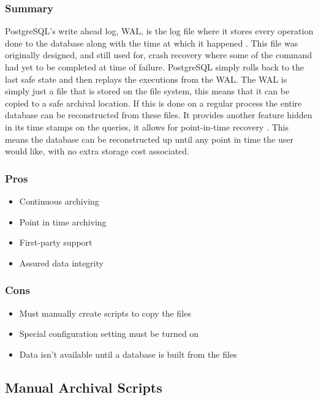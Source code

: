 \documentclass[draftclsnofoot,onecolumn,journal,letterpaper,compsoc,10pt]{IEEEtran}
\begin{document}
        \subsubsection{Summary}
        
        PostgreSQL's write ahead log, WAL, is the log file where it stores every operation done to the database along with the time at which it happened \cite{postgresql_wal}.  This file was originally designed, and still used for, crash recovery where some of the command had yet to be completed at time of failure.  PostgreSQL simply rolls back to the last safe state and then replays the executions from the WAL.  The WAL is simply just a file that is stored on the file system, this means that it can be copied to a safe archival location.  If this is done on a regular process the entire database can be reconstructed from these files.  It provides another feature hidden in its time stamps on the queries, it allows for point-in-time recovery \cite{postgresql_wal}.  This means the database can be reconstructed up until any point in time the user would like, with no extra storage cost associated.
        
        \subsubsection{Pros}
        \begin{itemize}
            \item Continuous archiving
            \item Point in time archiving
            \item First-party support
            \item Assured data integrity
        \end{itemize}
        
        \subsubsection{Cons}
        \begin{itemize}
            \item Must manually create scripts to copy the files
            \item Special configuration setting must be turned on
            \item Data isn't available until a database is built from the files
        \end{itemize}
    
    \subsection{Manual Archival Scripts}
    
\end{document}
